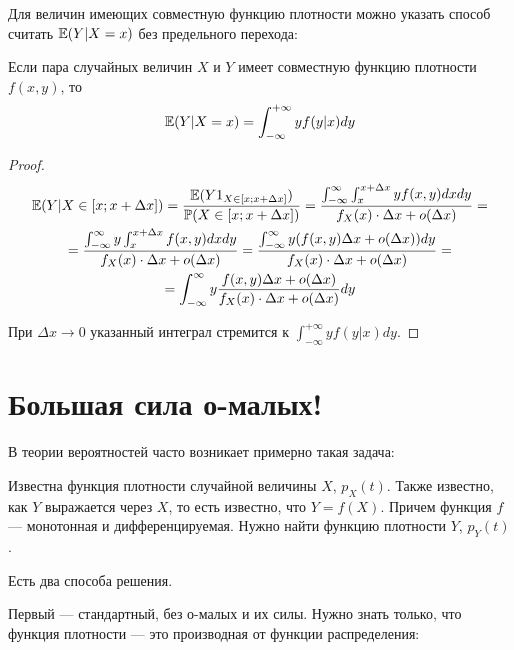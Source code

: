 Для величин имеющих совместную функцию плотности можно указать способ считать $ \mathbb{E}(Y|X=x) $ без предельного перехода:
\begin{myth} Если пара случайных величин $ X $ и $ Y $ имеет совместную функцию плотности $ f(x,y) $, то
\begin{equation}
\mathbb{E}(Y|X=x)=\int_{-\infty}^{+\infty}yf(y|x)dy
\end{equation}
\end{myth}

\begin{proof}
\begin{multline}
\mathbb{E}(Y|X\in [x;x+\Delta x])=\frac{\mathbb{E}(Y1_{X\in[x;x+\Delta x]})}{\mathbb{P}(X\in[x;x+\Delta x])}=\frac{\int_{-\infty}^{\infty}\int_{x}^{x+\Delta x} y f(x,y)dx dy }{f_{X}(x)\cdot \Delta x+o(\Delta x)}= \\
=\frac{\int_{-\infty}^{\infty}y\int_{x}^{x+\Delta x}  f(x,y)dx dy }{f_{X}(x)\cdot \Delta x+o(\Delta x)}=\frac{\int_{-\infty}^{\infty}y (f(x,y)\Delta x +o(\Delta x) ) dy }{f_{X}(x)\cdot \Delta x+o(\Delta x)}= \\
=\int_{-\infty}^{\infty}y \frac{f(x,y)\Delta x +o(\Delta x) }{f_{X}(x)\cdot \Delta x+o(\Delta x)} dy
\end{multline}

При $ \Delta x\to 0 $ указанный интеграл стремится к $ \int_{-\infty}^{+\infty}yf(y|x)dy $.
\end{proof}













\section{Большая сила о-малых!}

В теории вероятностей часто возникает примерно такая задача:

Известна функция плотности случайной величины $ X $, $ p_{X}(t) $. Также известно, как $ Y $ выражается через $ X $, то есть известно, что $ Y=f(X) $. Причем функция $ f $ — монотонная и дифференцируемая. Нужно найти функцию плотности $ Y $, $ p_{Y}(t) $.

Есть два способа решения.

Первый — стандартный, без о-малых и их силы. Нужно знать только, что функция плотности — это производная от функции распределения:

